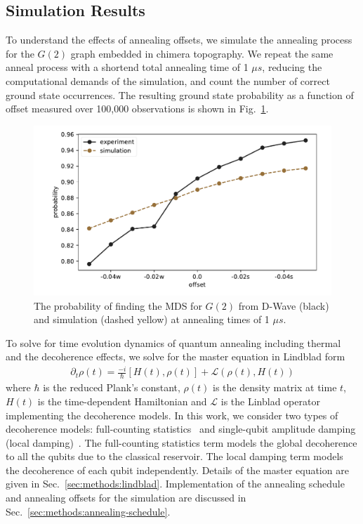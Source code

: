 \documentclass[10pt]{iopart}
\begin{document}
\subsection{Simulation Results}
\label{sec:results:simulation}
To understand the effects of annealing offsets, we simulate the annealing process for the $G(2)$ graph embedded in chimera topography.
We repeat the same anneal process with a shortend total annealing time of 1 $\mu s$, reducing the computational demands of the simulation, and count the number of correct ground state occurrences.
The resulting ground state probability as a function of offset measured over 100,000 observations is shown in Fig.~\ref{fig:dwave1us}.

\begin{figure}[b]
	\centering
	\includegraphics[width=\columnwidth]{./new_figures/NN2_offset_scaling.pdf}
	\caption{The probability of finding the MDS for $G(2)$ from D-Wave (black) and simulation (dashed yellow) at annealing times of 1 $\mu s$.}
	\label{fig:dwave1us}
\end{figure}


To solve for time evolution dynamics of quantum annealing including thermal and the decoherence effects, we solve for the master equation in Lindblad form
\begin{align}
 \label{eq:sim:linblad-eq}
 \partial_t \rho (t) =  \frac{-i}{\hbar} [H(t) , \rho(t)] + \mathcal{L}(\rho(t), H(t))
\end{align}
where $\hbar$ is the reduced Plank's constant, $\rho (t)$ is the density matrix at time $t$, $H(t)$ is the time-dependent Hamiltonian and $\mathcal{L}$ is the Linblad operator implementing the decoherence models.
In this work, we consider two types of decoherence models: full-counting statistics~\cite{PhysRevE.90.022103,RevModPhys.81.1665} and single-qubit amplitude damping (local damping)~\cite{10.5555/1972505,preskill1998lecture}.
The full-counting statistics term models the global decoherence to all the qubits due to the classical reservoir.
The local damping term models the decoherence of each qubit independently.
Details of the master equation are given in Sec.~\ref{sec:methods:lindblad}.
Implementation of the annealing schedule and annealing offsets for the simulation are discussed in Sec.~\ref{sec:methods:annealing-schedule}.
\end{document}
